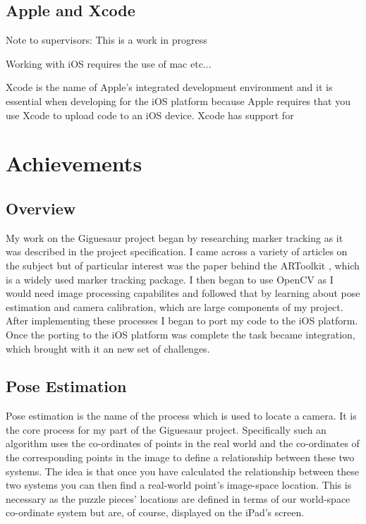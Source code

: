 \documentclass{article}
\begin{document}
\subsection{Apple and Xcode}

Note to supervisors: This is a work in progress

Working with iOS requires the use of mac etc...

Xcode is the name of Apple's integrated development environment and it is essential when developing for the iOS platform because Apple requires that you use Xcode to upload code to an iOS device. Xcode has support for 

\section{Achievements}

\subsection{Overview}

My work on the Giguesaur project began by researching marker tracking as it was described in the project specification. I came across a variety of articles on the subject but of particular interest was the paper behind the ARToolkit \cite{artoolkit}, which is a widely used marker tracking package. I then began to use OpenCV as I would need image processing capabilites and followed that by learning about pose estimation and camera calibration, which are large components of my project. After implementing these processes I began to port my code to the iOS platform. Once the porting to the iOS platform was complete the task became integration, which brought with it an new set of challenges. 

\subsection{Pose Estimation}

Pose estimation is the name of the process which is used to locate a camera. It is the core process for my part of the Giguesaur project. Specifically such an algorithm uses the co-ordinates of points in the real world and the co-ordinates of the corresponding points in the image to define a relationship between these two systems. The idea is that once you have calculated the relationship between these two systems you can then find a real-world point's image-space location. This is necessary as the puzzle pieces' locations are defined in terms of our world-space co-ordinate system but are, of course, displayed on the iPad's screen. 
\end{document}
